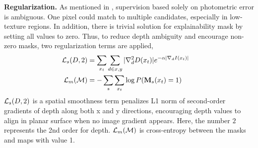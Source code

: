 

\textbf{Regularization.} 
As mentioned in , supervision based solely on photometric error is ambiguous. One pixel could match to multiple candidates, especially in low-texture regions. In addition, there is trivial solution for explainability mask by setting all values to zero. Thus, to reduce depth ambiguity and encourage non-zero masks, two regularization terms are applied, 
\begin{align}
\label{eqn:regular}
{\mathcal L}_{s}(D, 2) &= \sum_{x_t}\sum_{d \in {x, y}}|\nabla^{2}_dD(x_t)|e^{-\alpha|\nabla_dI(x_t)|} & \nonumber \\
{\mathcal L}_{m}({\mathcal M}) &= -\sum_s\sum_{x_t}\log P({\mathbf M_s}(x_t) = 1) &
\end{align}
${\mathcal L}_{s}(D, 2)$ is a spatial smoothness term penalizes L1 norm of second-order gradients of depth along both x and y directions, encouraging depth values to align in planar surface when no image gradient appears. Here, the number $2$ represents the 2nd order for depth. ${\mathcal L}_{m}({\mathcal M})$ is cross-entropy between the masks and maps with value 1.

